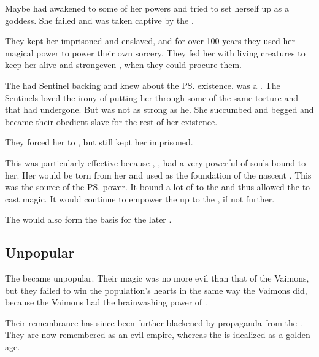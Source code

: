 Maybe \Ishicah{} had awakened to some of her powers and tried to set herself up as a goddess. 
She failed and was taken captive by the \Ortaicans. 

They kept her imprisoned and enslaved, and for over 100 years they used her magical power to power their own sorcery. 
They fed her with living creatures to keep her alive and strong\dash even \resphain, when they could procure them. 

The \rethyaxes{} had Sentinel backing and knew about the \ps{\resphain}{} existence. 
\Ishicah{} was a \sathariah{}. 
The Sentinels loved the irony of putting her through some of the same torture and  that \Nexagglachel{} had undergone. 
But \Ishicah{} was not as strong as he. 
She succumbed and begged and became their obedient slave for the rest of her existence. 

They forced her to , but still kept her imprisoned. 

This was particularly effective because \Ishicah{}, , had a very powerful \carcer{} of souls bound to her. 
Her \carcer{} would be torn from her and used as the foundation of the nascent \Ortaican{} \matrix. 
This \matrix{} was the source of the \ps{\rethyaxes} power. 
It bound a lot of \daemons{} to the \Taorthae{} and thus allowed the \rethyaxes{} to cast magic. 
It would continue to empower the \rethyaxes{} up to the , if not further.

The \Ortaican{} \matrix{} would also form the basis for the later . 





\subsection{Unpopular}
The \Ortaican{} \baccons{} became unpopular. 
Their magic was no more evil than that of the Vaimons, but they failed to win the population's hearts in the same way the Vaimons did, because the Vaimons had the brainwashing power of \Iquin. 

Their remembrance has since been further blackened by propaganda from the  . 
They are now remembered as an evil empire, whereas the \VaimonCaliphate is idealized as a golden age. 





